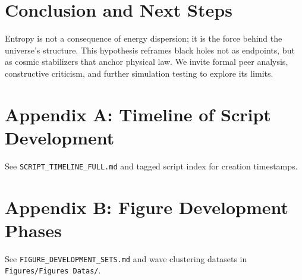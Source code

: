 \documentclass[12pt]{article}
\begin{document}
\section{Conclusion and Next Steps}
Entropy is not a consequence of energy dispersion; it is the force behind the universe's structure. This hypothesis reframes black holes not as endpoints, but as cosmic stabilizers that anchor physical law. We invite formal peer analysis, constructive criticism, and further simulation testing to explore its limits.

\appendix

\section{Appendix A: Timeline of Script Development}
See \texttt{SCRIPT\_TIMELINE\_FULL.md} and tagged script index for creation timestamps.

\section{Appendix B: Figure Development Phases}
See \texttt{FIGURE\_DEVELOPMENT\_SETS.md} and wave clustering datasets in \texttt{Figures/Figures Datas/}.
\end{document}

